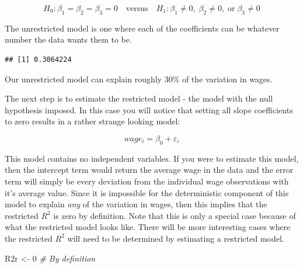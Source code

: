 \documentclass[
]{book}
\newenvironment{Shaded}{\begin{snugshade}}{\end{snugshade}}
\newcommand{\AttributeTok}[1]{\textcolor[rgb]{0.77,0.63,0.00}{#1}}
\newcommand{\CommentTok}[1]{\textcolor[rgb]{0.56,0.35,0.01}{\textit{#1}}}
\newcommand{\DecValTok}[1]{\textcolor[rgb]{0.00,0.00,0.81}{#1}}
\newcommand{\FunctionTok}[1]{\textcolor[rgb]{0.00,0.00,0.00}{#1}}
\newcommand{\NormalTok}[1]{#1}
\newcommand{\OtherTok}[1]{\textcolor[rgb]{0.56,0.35,0.01}{#1}}
\newcommand{\SpecialCharTok}[1]{\textcolor[rgb]{0.00,0.00,0.00}{#1}}
\newcommand{\StringTok}[1]{\textcolor[rgb]{0.31,0.60,0.02}{#1}}
\begin{document}
\[H_0: \beta_1 = \beta_2 = \beta_3 = 0 \quad \text{versus} \quad H_1: \beta_1 \neq 0, \; \beta_2 \neq 0, \; \text{or} \; \beta_3 \neq 0\]

The unrestricted model is one where each of the coefficients can be whatever number the data wants them to be.

\begin{Shaded}
\end{Shaded}

\begin{verbatim}
## [1] 0.3064224
\end{verbatim}

Our unrestricted model can explain roughly 30\% of the variation in wages.

The next step is to estimate the restricted model - the model with the null hypothesis imposed. In this case you will notice that setting all slope coefficients to zero results in a rather strange looking model:

\[wage_i=\beta_0+\varepsilon_i\]

This model contains no independent variables. If you were to estimate this model, then the intercept term would return the average wage in the data and the error term will simply be every deviation from the individual wage observations with it's average value. Since it is impossible for the deterministic component of this model to explain \emph{any} of the variation in wages, then this implies that the restricted \(R^2\) is zero by definition. Note that this is only a special case because of what the restricted model looks like. There will be more interesting cases where the restricted \(R^2\) will need to be determined by estimating a restricted model.

\begin{Shaded}
\begin{Highlighting}[]
\NormalTok{R2r }\OtherTok{\textless{}{-}} \DecValTok{0} \CommentTok{\# By definition}
\end{Highlighting}
\end{Shaded}
\end{document}
